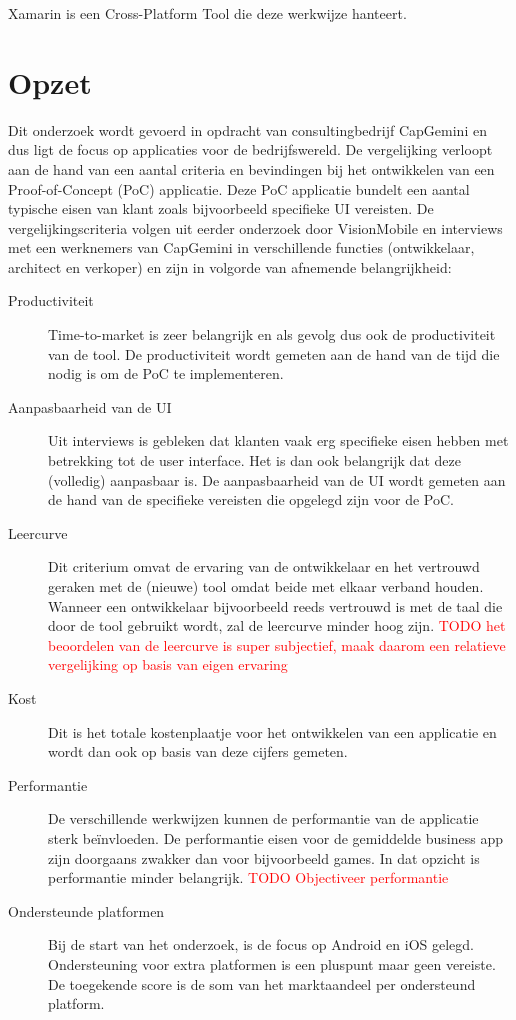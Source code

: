 \documentclass[a4paper]{IEEEconf}
\newcommand{\TODO}[1]{\textcolor{red}{TODO #1}}
\begin{document}
Xamarin is een Cross-Platform Tool die deze werkwijze hanteert.

\section{Opzet}

Dit onderzoek wordt gevoerd in opdracht van consultingbedrijf CapGemini en dus ligt de focus op applicaties voor de bedrijfswereld. De vergelijking verloopt aan de hand van een aantal criteria en bevindingen bij het ontwikkelen van een Proof-of-Concept (PoC) applicatie. Deze PoC applicatie bundelt een aantal typische eisen van klant zoals bijvoorbeeld specifieke UI vereisten. De vergelijkingscriteria volgen uit eerder onderzoek door VisionMobile \cite{VM_CPT:2012} en interviews met een werknemers van CapGemini in verschillende functies (ontwikkelaar, architect en verkoper) en zijn in volgorde van afnemende belangrijkheid:

\begin{description}
    \item[Productiviteit] Time-to-market is zeer belangrijk en als gevolg dus ook de productiviteit van de tool. De productiviteit wordt gemeten aan de hand van de tijd die nodig is om de PoC te implementeren. 
    \item[Aanpasbaarheid van de UI] Uit interviews is gebleken dat klanten vaak erg specifieke eisen hebben met betrekking tot de user interface. Het is dan ook belangrijk dat deze (volledig) aanpasbaar is. De aanpasbaarheid van de UI wordt gemeten aan de hand van de specifieke vereisten die opgelegd zijn voor de PoC.
    \item[Leercurve] Dit criterium omvat de ervaring van de ontwikkelaar en het vertrouwd geraken met de (nieuwe) tool omdat beide met elkaar verband houden. Wanneer een ontwikkelaar bijvoorbeeld reeds vertrouwd is met de taal die door de tool gebruikt wordt, zal de leercurve minder hoog zijn. \TODO{het beoordelen van de leercurve is super subjectief, maak daarom een relatieve vergelijking op basis van eigen ervaring}
    \item[Kost] Dit is het totale kostenplaatje voor het ontwikkelen van een applicatie en wordt dan ook op basis van deze cijfers gemeten.
    \item[Performantie] De verschillende werkwijzen kunnen de performantie van de applicatie sterk beïnvloeden. De performantie eisen voor de gemiddelde business app zijn doorgaans zwakker dan voor bijvoorbeeld games. In dat opzicht is performantie minder belangrijk. \TODO{Objectiveer performantie}
    \item[Ondersteunde platformen] Bij de start van het onderzoek, is de focus op Android en iOS gelegd. Ondersteuning voor extra platformen is een pluspunt maar geen vereiste. De toegekende score is de som van het marktaandeel per ondersteund platform.  
\end{description}
\end{document}
